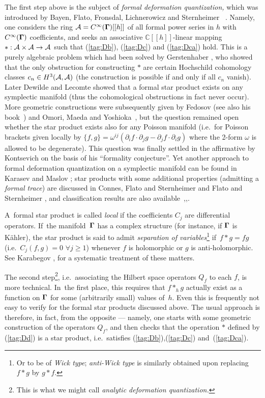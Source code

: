 \documentclass[11pt]{amsart}
\numberwithin{equation}{section}
\theoremstyle{remark}
\newcommand\AAA{{\Cal A}}
\newcommand\Omg{{\bigam}}   %
\newcommand{\CC}{\C}
\newcommand{\bigam}{\mbox{\boldmath $\Gamma$}}
\newcommand{\C}{\mathbb C}
\begin{document}
The first step above is the subject of {\sl formal deformation quantization,\/}
which was introduced by Bayen, Flato, Fronsdal, Lichnerowicz and Sternheimer~
\cite{bib:BFFLS}. Namely, one considers the ring $\AAA=C^\infty(\Omg)[[h]]$ of
all formal power series in $h$ with $C^\infty(\Omg)$ coefficients, and seeks an
associative $\CC[[h]]$-linear mapping $*:\AAA\times\AAA\to\AAA$ such that
(\ref{tag:Db}), (\ref{tag:Dc}) and (\ref{tag:Dca}) hold. This is a purely
algebraic problem which had been solved by Gerstenhaber \cite{bib:Gerst}, who
showed that the only obstruction for constructing $*$ are certain Hochschild
cohomology classes $c_n\in H^3(\AAA,\AAA)$ (the construction is possible if and
only if all $c_n$ vanish). Later Dewilde and Lecomte \cite{bib:DewLe} showed
that a formal star product exists on any symplectic manifold (thus the
cohomological obstructions in fact never occur). More geometric constructions
were subsequently given by Fedosov \cite{bib:Fedos} (see also his
book~\cite{bib:FedosBk}) and Omori, Maeda and Yoshioka~\cite{bib:OMY}, but the
question remained open whether the star product exists also for any Poisson
manifold (i.e.~for Poisson brackets given locally by $\{f,g\} = \omega^{ij}
(\partial_i f\cdot\partial_j g - \partial_j f\cdot \partial_i g)$ where the
2-form $\omega$ is allowed to be degenerate). This question was finally settled
in the affirmative by Kontsevich \cite{bib:Kon} on the basis of his ``formality
conjecture''. Yet another approach to formal deformation quantization on a
symplectic manifold can be found in Karasev and Maslov \cite{bib:KMbk}; star
products with some additional properties (admitting a {\sl formal trace\/}) are
discussed in Connes, Flato and Sternheimer \cite{bib:FScl} and Flato and
Sternheimer \cite{bib:FSbk}, and classification results are also
available~\cite{bib:BertCG},\cite{bib:Delig},\cite{bib:NTsy}.

A~formal star product is called {\sl local\/} if the coefficients $C_j$ are
differential operators. If~the manifold~$\Omg$ has a complex structure (for
instance, if $\Omg$ is K\"ahler), the star product is said to admit {\sl
separation of variables\/}\footnote{Or to be of {\sl Wick type\/};
{\sl anti-Wick type\/} is similarly obtained upon replacing $f*g$ by $g*f$.}
if~$f*g=fg$ (i.e.~$C_j(f,g)=0$ $\forall j\ge1$) whenever $f$ is holomorphic
or $g$ is anti-holomorphic. See Karabegov \cite{bib:KarA}, \cite{bib:KarB} for
a systematic treatment of these matters.

The second step\footnote{This is what we might call {\sl analytic deformation
quantization.\/}}, i.e.~associating the Hilbert space operators $Q_f$ to each
$f$, is more technical. In~the first place, this requires that $f*_h g$
actually exist as a function on $\Omg$ for some (arbitrarily small) values
of~$h$. Even this is frequently not easy to verify for the formal star products
discussed above. The usual approach is therefore, in fact, from the opposite
--- namely, one starts with some geometric construction of the operators $Q_f$,
and then checks that the operation $*$ defined by (\ref{tag:Dd}) is a star
product, i.e.~satisfies (\ref{tag:Db}),(\ref{tag:Dc}) and~(\ref{tag:Dca}).
\end{document}
